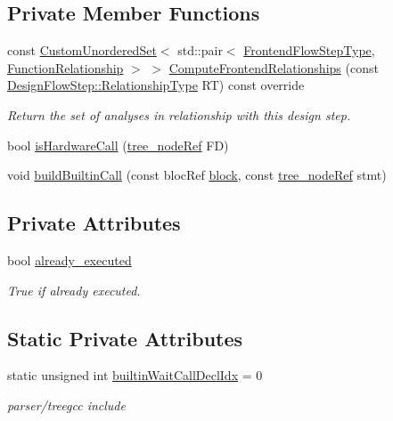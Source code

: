 \subsection*{Private Member Functions}
\begin{DoxyCompactItemize}
\item 
const \hyperlink{classCustomUnorderedSet}{Custom\+Unordered\+Set}$<$ std\+::pair$<$ \hyperlink{frontend__flow__step_8hpp_afeb3716c693d2b2e4ed3e6d04c3b63bb}{Frontend\+Flow\+Step\+Type}, \hyperlink{classFrontendFlowStep_af7cf30f2023e5b99e637dc2058289ab0}{Function\+Relationship} $>$ $>$ \hyperlink{classHWCallInjection_a454d28bb8bc73465ccfb57e515717f7b}{Compute\+Frontend\+Relationships} (const \hyperlink{classDesignFlowStep_a723a3baf19ff2ceb77bc13e099d0b1b7}{Design\+Flow\+Step\+::\+Relationship\+Type} RT) const override
\begin{DoxyCompactList}\small\item\em Return the set of analyses in relationship with this design step. \end{DoxyCompactList}\item 
bool \hyperlink{classHWCallInjection_a360d7a448f3af6dcb63c4766305531e7}{is\+Hardware\+Call} (\hyperlink{tree__node_8hpp_a6ee377554d1c4871ad66a337eaa67fd5}{tree\+\_\+node\+Ref} FD)
\item 
void \hyperlink{classHWCallInjection_a384a02ea581f0406948fe6823fe35b8a}{build\+Builtin\+Call} (const bloc\+Ref \hyperlink{structblock}{block}, const \hyperlink{tree__node_8hpp_a6ee377554d1c4871ad66a337eaa67fd5}{tree\+\_\+node\+Ref} stmt)
\end{DoxyCompactItemize}
\subsection*{Private Attributes}
\begin{DoxyCompactItemize}
\item 
bool \hyperlink{classHWCallInjection_abed1fda434c2003c2b776faac294ac90}{already\+\_\+executed}
\begin{DoxyCompactList}\small\item\em True if already executed. \end{DoxyCompactList}\end{DoxyCompactItemize}
\subsection*{Static Private Attributes}
\begin{DoxyCompactItemize}
\item 
static unsigned int \hyperlink{classHWCallInjection_af931a33b0365ab1d8feb625f6f24b5b5}{builtin\+Wait\+Call\+Decl\+Idx} = 0
\begin{DoxyCompactList}\small\item\em parser/treegcc include \end{DoxyCompactList}\end{DoxyCompactItemize}
